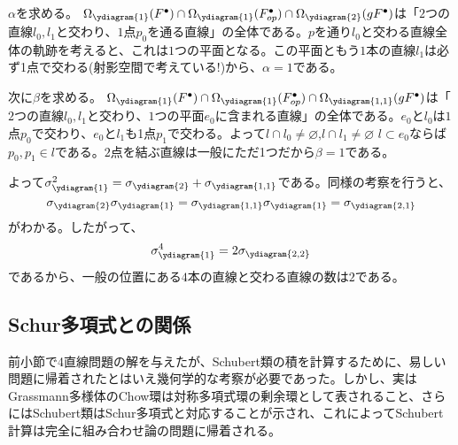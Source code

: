 \documentclass{ltjsreport}
\begin{document}
\begin{eg}
  $\alpha$を求める。
  $\Omega_{\ydiagram{1}}(F^\bullet)\cap
  \Omega_{\ydiagram{1}}(F^\bullet_{op})\cap
  \Omega_{\ydiagram{2}}(gF^\bullet)$は「$2$つの直線$l_0,l_1$と交わり、$1$点$p_0$を通る直線」の全体である。$p$を通り$l_0$と交わる直線全体の軌跡を考えると、これは$1$つの平面となる。この平面ともう$1$本の直線$l_1$は必ず1点で交わる(射影空間で考えている!)から、$\alpha=1$である。

  次に$\beta$を求める。
  $\Omega_{\ydiagram{1}}(F^\bullet)\cap
  \Omega_{\ydiagram{1}}(F^\bullet_{op})\cap
  \Omega_{\ydiagram{1,1}}(gF^\bullet)$は「$2$つの直線$l_0,l_1$と交わり、$1$つの平面$e_0$に含まれる直線」の全体である。$e_0$と$l_0$は$1$点$p_0$で交わり、$e_0$と$l_1$も1点$p_1$で交わる。よって$l\cap l_0\neq\varnothing$,$l\cap l_1\neq\varnothing$ $l\subset e_0$ならば$p_0,p_1\in l$である。$2$点を結ぶ直線は一般にただ1つだから$\beta=1$である。

  よって$\sigma_{\ydiagram{1}}^2=\sigma_{\ydiagram{2}}+\sigma_{\ydiagram{1,1}}$である。同様の考察を行うと、
  \[
  \sigma_{\ydiagram{2}}\sigma_{\ydiagram{1}}=\sigma_{\ydiagram{1,1}}\sigma_{\ydiagram{1}}=\sigma_{\ydiagram{2,1}}  
  \]
  がわかる。したがって、
  \[
  \sigma_{\ydiagram{1}}^4=2\sigma_{\ydiagram{2,2}}  
  \]
  であるから、一般の位置にある$4$本の直線と交わる直線の数は$2$である。
\end{eg}


\subsection{Schur多項式との関係}

前小節で4直線問題の解を与えたが、Schubert類の積を計算するために、易しい問題に帰着されたとはいえ幾何学的な考察が必要であった。しかし、実はGrassmann多様体のChow環は対称多項式環の剰余環として表されること、さらにはSchubert類はSchur多項式と対応することが示され、これによってSchubert計算は完全に組み合わせ論の問題に帰着される。
\end{document}
